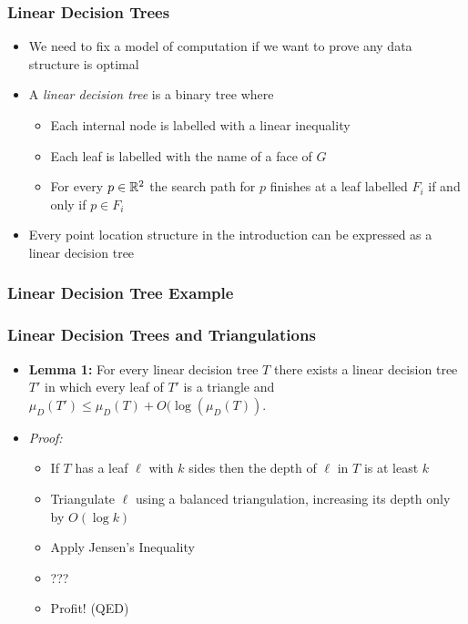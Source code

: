 \documentclass{beamer}
\begin{document}
\frame
{
   \frametitle{Linear Decision Trees}
   \begin{itemize}
     \item<1-> We need to fix a model of computation if we want to
       prove any data structure is optimal
     \item<2-> A \emph{linear decision tree} is a binary tree where
       \begin{itemize}
          \item Each internal node is labelled with a linear inequality
          \item Each leaf is labelled with the name of a face of $G$
          \item For every $p\in\mathbb{R}^2$ the search path for $p$ finishes at 
           a leaf labelled $F_i$ if and only if $p\in F_i$
       \end{itemize}
     \item<3-> Every point location structure in the
	introduction can be expressed as a linear decision tree
   \end{itemize}
}




\frame
{
	\frametitle{Linear Decision Tree Example}
}

\frame
{
   \frametitle{Linear Decision Trees and Triangulations}
   \begin{itemize}
     \item<1->
     \textbf{Lemma 1:}
       For every linear decision tree $T$ there exists a linear
decision tree $T'$ in which every leaf of $T'$ is a triangle and 
$\mu_D(T') \le \mu_D(T) + O(\log(\mu_D(T))$.
     \item<2-> \textit{Proof:}
      \begin{itemize}
        \item<3-> If $T$ has a leaf $\ell$ with $k$ sides then
          the depth of $\ell$ in $T$ is at least $k$ 
        \item<4-> Triangulate $\ell$ using a balanced triangulation,
increasing its depth only by $O(\log k)$
        \item<5-> Apply Jensen's Inequality
        \item<6-> ???
        \item<7-> Profit! (QED)
     \end{itemize}
   \end{itemize}
}
\end{document}
